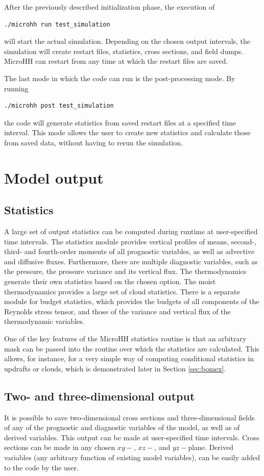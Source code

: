 \documentclass[gmd,manuscript]{copernicus}
\begin{document}
After the previously described initialization phase, the execution of
\begin{verbatim}
./microhh run test_simulation
\end{verbatim}
will start the actual simulation. Depending on the chosen output intervals, the simulation will create restart files, statistics, cross sections, and field dumps. MicroHH can restart from any time at which the restart files are saved.

The last mode in which the code can run is the post-processing mode. By running 
\begin{verbatim}
./microhh post test_simulation
\end{verbatim}
the code will generate statistics from saved restart files at a specified time interval. This mode allows the user to create new statistics and calculate those from saved data, without having to rerun the simulation.

\section{Model output}\label{sec:output}
\subsection{Statistics}
A large set of output statistics can be computed during runtime at user-specified time intervals. The statistics module provides vertical profiles of means, second-, third- and fourth-order moments of all prognostic variables, as well as advective and diffusive fluxes. Furthermore, there are multiple diagnostic variables, such as the pressure, the pressure variance and its vertical flux. The thermodynamics generate their own statistics based on the chosen option. The moist thermodynamics provides a large set of cloud statistics. There is a separate module for budget statistics, which provides the budgets of all components of the Reynolds stress tensor, and those of the variance and vertical flux of the thermodynamic variables.

One of the key features of the MicroHH statistics routine is that an arbitrary mask can be passed into the routine over which the statistics are calculated. This allows, for instance, for a very simple way of computing conditional statistics in updrafts or clouds, which is demonstrated later in Section \ref{sec:bomex}.

\subsection{Two- and three-dimensional output}
It is possible to save two-dimensional cross sections and three-dimensional fields of any of the prognostic and diagnostic variables of the model, as well as of derived variables. This output can be made at user-specified time intervals. Cross sections can be made in any chosen $xy-$, $xz-$, and $yz-$plane. Derived variables (any arbitrary function of existing model variables), can be easily added to the code by the user.
\end{document}
